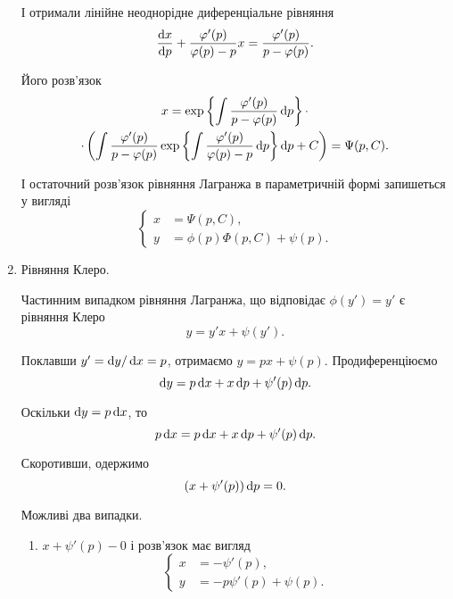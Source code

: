 \begin{enumerate}
	І отримали лінійне неоднорідне диференціальне рівняння
	\begin{equation*}
		\frac{\mathop{}\!\mathrm{d} x}{\mathop{}\!\mathrm{d} p} + \frac{\varphi'(p)}{\varphi(p)-p} x = \frac{\varphi'(p)}{p-\varphi(p)}.
	\end{equation*}
	
	Його роз\-в'яз\-ок
	\begin{multline*}
		x = \exp\left\{\int \frac{\varphi'(p)}{p-\varphi(p)} \mathop{}\!\mathrm{d} p\right\} \cdot \\
		 \cdot \left(\int \frac{\varphi'(p)}{p-\varphi(p)} \exp\left\{\int \frac{\varphi'(p)}{\varphi(p)-p} \mathop{}\!\mathrm{d} p\right\} \mathop{}\!\mathrm{d} p + C \right) = \Psi(p, C).
	\end{multline*}
	
	І остаточний розв'язок рівняння Лагранжа в параметричній формі запишеться у вигляді
	\begin{equation*}
		\left\{
			\begin{aligned}
				x &= \Psi(p,C), \\
				y &= \phi(p) \Phi(p, C) + \psi(p).
			\end{aligned}
		\right.
	\end{equation*}
	
	\item Рівняння Клеро. \parvskip

	Частинним випадком рівняння Лагранжа, що відповідає $\phi(y') = y'$ є рівняння Клеро
 	\begin{equation*}
 		y = y' x + \psi(y').
 	\end{equation*}
	
	Поклавши $y' = \mathop{}\!\mathrm{d} y / \mathop{}\!\mathrm{d} x = p$, отримаємо $y = p x + \psi(p)$. Продиференціюємо 
	\begin{equation*}
		\mathop{}\!\mathrm{d} y = p \mathop{}\!\mathrm{d} x + x \mathop{}\!\mathrm{d} p + \psi'(p) \mathop{}\!\mathrm{d} p.
	\end{equation*}
	
	Оскільки $\mathop{}\!\mathrm{d} y = p \mathop{}\!\mathrm{d} x$, то
	\begin{equation*}
		p \mathop{}\!\mathrm{d} x = p \mathop{}\!\mathrm{d} x + x \mathop{}\!\mathrm{d} p + \psi'(p) \mathop{}\!\mathrm{d} p.
	\end{equation*}
	
	Скоротивши, одержимо
	\begin{equation*}
		(x + \psi'(p)) \mathop{}\!\mathrm{d} p = 0.
	\end{equation*}
	
	Можливі два випадки.
	\begin{enumerate}
		\item $x + \psi'(p) - 0$ і розв'язок має вигляд
		\begin{equation*}
			\left\{
				\begin{aligned}
					x &= - \psi'(p), \\
					y &= -p \psi'(p) + \psi(p).
				\end{aligned}
			\right.
		\end{equation*}
		

\end{enumerate}
\end{enumerate}
